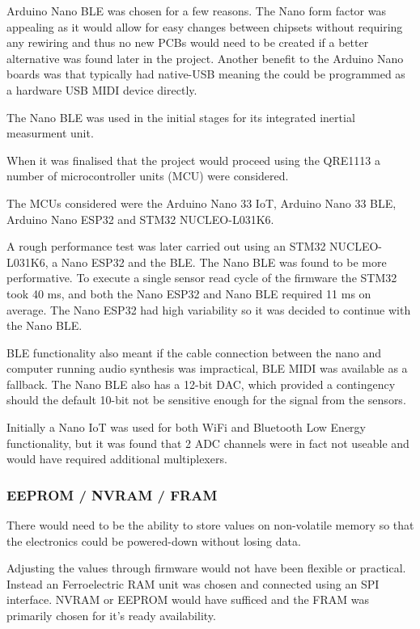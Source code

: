 Arduino Nano BLE was chosen for a few reasons. The Nano form factor was
appealing as it would allow for easy changes between chipsets without
requiring any rewiring and thus no new PCBs would need to be created if
a better alternative was found later in the project. Another benefit to
the Arduino Nano boards was that typically had native-USB meaning the
could be programmed as a hardware USB MIDI device directly.

The Nano BLE was used in the initial stages for its integrated inertial measurment unit.

When it was finalised that the project would proceed using the QRE1113 a
number of microcontroller units (MCU) were considered.

The MCUs considered were the Arduino Nano 33 IoT, Arduino Nano 33 BLE,
Arduino Nano ESP32 and STM32 NUCLEO-L031K6.

A rough performance test was later carried out using an STM32
NUCLEO-L031K6, a Nano ESP32 and the BLE. The Nano BLE was found to be
more performative. To execute a single sensor read cycle of the firmware
the STM32 took 40 ms, and both the Nano ESP32 and Nano BLE required 11 ms
on average. The Nano ESP32 had high variability so it was decided to
continue with the Nano BLE. 



BLE functionality also meant if the cable connection between the nano
and computer running audio synthesis was impractical, BLE MIDI was
available as a fallback. The Nano BLE also has a 12-bit DAC, which
provided a contingency should the default 10-bit not be sensitive enough
for the signal from the sensors.

Initially a Nano IoT was used for both WiFi and Bluetooth Low Energy
functionality, but it was found that 2 ADC channels were in fact not
useable and would have required additional multiplexers.

\subsubsection{EEPROM / NVRAM / FRAM}\label{eeprom-nvram-fram}

There would need to be the ability to store values on non-volatile
memory so that the electronics could be powered-down without losing
data.

Adjusting the values through firmware would not have been flexible or
practical. Instead an Ferroelectric RAM unit was chosen and connected
using an SPI interface. NVRAM or EEPROM would have sufficed and the FRAM
was primarily chosen for it's ready availability.


